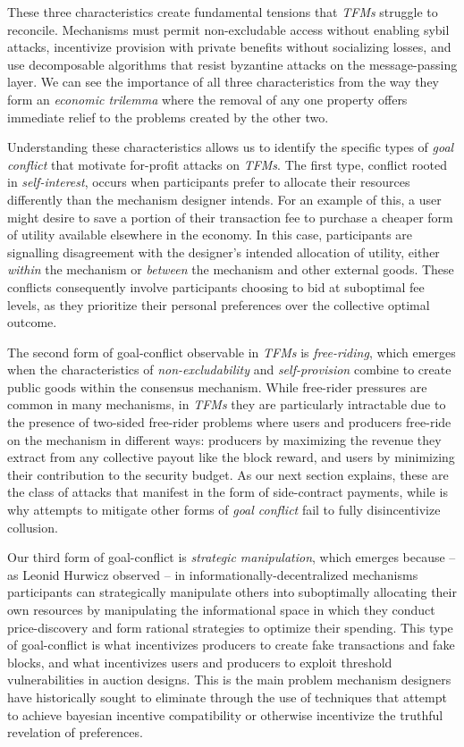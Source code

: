 These three characteristics create fundamental tensions that \textit{TFMs} struggle to reconcile. Mechanisms must permit non-excludable access without enabling sybil attacks, incentivize provision with private benefits without socializing losses, and use decomposable algorithms that resist byzantine attacks on the message-passing layer. We can see the importance of all three characteristics from the way they form an \emph{economic trilemma} where the removal of any one property offers immediate relief to the problems created by the other two.

Understanding these characteristics allows us to identify the specific types of \textit{goal conflict} that motivate for-profit attacks on \textit{TFMs}. The first type, conflict rooted in \textit{self-interest}, occurs when participants prefer to allocate their resources differently than the mechanism designer intends. For an example of this, a user might desire to save a portion of their transaction fee to purchase a cheaper form of utility available elsewhere in the economy. In this case, participants are signalling disagreement with the designer's intended allocation of utility, either \textit{within} the mechanism or \textit{between} the mechanism and other external goods. These conflicts consequently involve participants choosing to bid at suboptimal fee levels, as they prioritize their personal preferences over the collective optimal outcome.

The second form of goal-conflict observable in \textit{TFMs} is \textit{free-riding}, which emerges when the characteristics of \textit{non-excludability} and \textit{self-provision} combine to create public goods within the consensus mechanism. While free-rider pressures are common in many mechanisms, in \textit{TFMs} they are particularly intractable due to the presence of two-sided free-rider problems where users and producers free-ride on the mechanism in different ways: producers by maximizing the revenue they extract from any collective payout like the block reward, and users by minimizing their contribution to the security budget. As our next section explains, these are the class of attacks that manifest in the form of side-contract payments, while is why attempts to mitigate other forms of \textit{goal conflict} fail to fully disincentivize collusion.

Our third form of goal-conflict is \textit{strategic manipulation}, which emerges because -- as Leonid Hurwicz observed -- in informationally-decentralized mechanisms participants can strategically manipulate others into suboptimally allocating their own resources by manipulating the informational space in which they conduct price-discovery and form rational strategies to optimize their spending. This type of goal-conflict is what incentivizes producers to create fake transactions and fake blocks, and what incentivizes users and producers to exploit threshold vulnerabilities in auction designs. This is the main problem mechanism designers have historically sought to eliminate through the use of techniques that attempt to achieve bayesian incentive compatibility or otherwise incentivize the truthful revelation of preferences.

